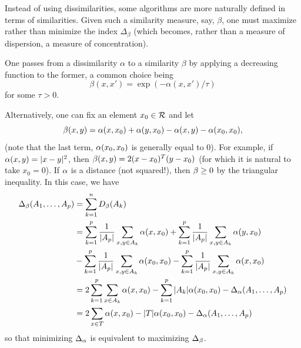 \begin{remark}
Instead of using dissimilarities, some algorithms are more naturally defined in terms of similarities. Given such a similarity measure, say, $\beta$, one must maximize rather than minimize the index $\Delta_\beta$ (which becomes, rather than a measure of dispersion, a measure of concentration).


One passes from a dissimilarity $\alpha$ to a similarity $\beta$  by applying a decreasing function to the former, a common choice being
\[
 \beta(x,x') = \exp(-\alpha(x,x')/\tau)
 \]
for some $\tau>0$.

Alternatively, one can fix an element $x_0\in {\mathcal R}$ and  let 
\[
\beta(x,y) = \alpha(x,x_0) + \alpha(y,x_0) - \alpha(x,y) - \alpha(x_0,x_0),
\]
(note that the last term, $\alpha(x_0,x_0)$ is generally equal to 0).  For example, if $\alpha(x,y) = |x-y|^2$, then $\beta(x,y) = 2(x-x_0)^T(y-x_0)$ (for which it is natural to take $x_0=0$). If $\alpha$ is a distance (not squared!), then $\beta \geq 0$ by the triangular inequality. In this case, we have 
\begin{align*}
\Delta_\beta(A_1, \ldots, A_p) &=
\sum_{k=1}^n D_\beta(A_k) \\
&= \sum_{k=1}^p \frac{1}{|A_p|} \sum_{x,y\in A_k} \alpha(x,x_0) + \sum_{k=1}^p \frac{1}{|A_p|} \sum_{x,y\in A_k} \alpha(y,x_0)\\
&- \sum_{k=1}^p \frac{1}{|A_p|} \sum_{x,y\in A_k} \alpha(x_0,x_0) - \sum_{k=1}^p \frac{1}{|A_p|} \sum_{x,y\in A_k} \alpha(x,x_0)\\
&= 2 \sum_{k=1}^p \sum_{x\in A_k} \alpha(x,x_0) - \sum_{k=1}^p |A_k| \alpha(x_0,x_0) - \Delta_\alpha(A_1, \ldots, A_p) \\
&= 2 \sum_{x\in T} \alpha(x,x_0) - |T| \alpha(x_0,x_0) - \Delta_\alpha(A_1, \ldots, A_p) 
\end{align*}
so that minimizing $\Delta_\alpha$ is equivalent to maximizing $\Delta_\beta$. 

\end{remark}


%


